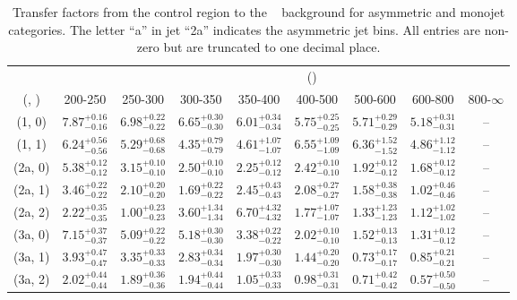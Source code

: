 \begin{table}[h!]
\tiny
\centering
\caption{Transfer factors from the \mmj control region to the \zInv~ background for asymmetric and monojet categories. The letter ``a'' in jet \eg ``2a''  indicates the asymmetric jet bins. All entries are non-zero but are truncated to one decimal place.\label{tab:tf_mumu_zinv_asym}}
\begin{tabular}
{ccccccccc}
	\hline\hline
&	& \multicolumn{8}{c}{\scalht (\gev)} \\ 
	 (\njet,  \nb) & 200-250 & 250-300 & 300-350 & 350-400 & 400-500 & 500-600 & 600-800 & 800-$\infty$ \\ [0.8ex] 
\hline
	(1, 0) & $7.87^{+ 0.16 }_{- 0.16 }$ & $6.98^{+ 0.22 }_{- 0.22 }$ & $6.65^{+ 0.30 }_{- 0.30 }$ & $6.01^{+ 0.34 }_{- 0.34 }$ & $5.75^{+ 0.25 }_{- 0.25 }$ & $5.71^{+ 0.29 }_{- 0.29 }$ & $5.18^{+ 0.31 }_{- 0.31 }$ & -- \\[0.5ex] 
	(1, 1) & $6.24^{+ 0.56 }_{- 0.56 }$ & $5.29^{+ 0.68 }_{- 0.68 }$ & $4.35^{+ 0.79 }_{- 0.79 }$ & $4.61^{+ 1.07 }_{- 1.07 }$ & $6.55^{+ 1.09 }_{- 1.09 }$ & $6.36^{+ 1.52 }_{- 1.52 }$ & $4.86^{+ 1.12 }_{- 1.12 }$ & -- \\[0.5ex] 
	(2a, 0) & $5.38^{+ 0.12 }_{- 0.12 }$ & $3.15^{+ 0.10 }_{- 0.10 }$ & $2.50^{+ 0.10 }_{- 0.10 }$ & $2.25^{+ 0.12 }_{- 0.12 }$ & $2.42^{+ 0.10 }_{- 0.10 }$ & $1.92^{+ 0.12 }_{- 0.12 }$ & $1.68^{+ 0.12 }_{- 0.12 }$ & -- \\[0.5ex] 
	(2a, 1) & $3.46^{+ 0.22 }_{- 0.22 }$ & $2.10^{+ 0.20 }_{- 0.20 }$ & $1.69^{+ 0.22 }_{- 0.22 }$ & $2.45^{+ 0.43 }_{- 0.43 }$ & $2.08^{+ 0.27 }_{- 0.27 }$ & $1.58^{+ 0.38 }_{- 0.38 }$ & $1.02^{+ 0.46 }_{- 0.46 }$ & -- \\[0.5ex] 
	(2a, 2) & $2.22^{+ 0.35 }_{- 0.35 }$ & $1.00^{+ 0.23 }_{- 0.23 }$ & $3.60^{+ 1.34 }_{- 1.34 }$ & $6.70^{+ 4.32 }_{- 4.32 }$ & $1.77^{+ 1.07 }_{- 1.07 }$ & $1.33^{+ 1.23 }_{- 1.23 }$ & $1.12^{+ 1.02 }_{- 1.02 }$ & -- \\[0.5ex] 
	(3a, 0) & $7.15^{+ 0.37 }_{- 0.37 }$ & $5.09^{+ 0.22 }_{- 0.22 }$ & $5.18^{+ 0.30 }_{- 0.30 }$ & $3.38^{+ 0.22 }_{- 0.22 }$ & $2.02^{+ 0.10 }_{- 0.10 }$ & $1.52^{+ 0.13 }_{- 0.13 }$ & $1.31^{+ 0.12 }_{- 0.12 }$ & -- \\[0.5ex] 
	(3a, 1) & $3.93^{+ 0.47 }_{- 0.47 }$ & $3.35^{+ 0.33 }_{- 0.33 }$ & $2.83^{+ 0.34 }_{- 0.34 }$ & $1.97^{+ 0.30 }_{- 0.30 }$ & $1.44^{+ 0.20 }_{- 0.20 }$ & $0.73^{+ 0.17 }_{- 0.17 }$ & $0.85^{+ 0.21 }_{- 0.21 }$ & -- \\[0.5ex] 
	(3a, 2) & $2.02^{+ 0.44 }_{- 0.44 }$ & $1.89^{+ 0.36 }_{- 0.36 }$ & $1.94^{+ 0.44 }_{- 0.44 }$ & $1.05^{+ 0.33 }_{- 0.33 }$ & $0.98^{+ 0.31 }_{- 0.31 }$ & $0.71^{+ 0.42 }_{- 0.42 }$ & $0.57^{+ 0.50 }_{- 0.50 }$ & -- \\[0.5ex] 

\end{tabular}
\end{table}
